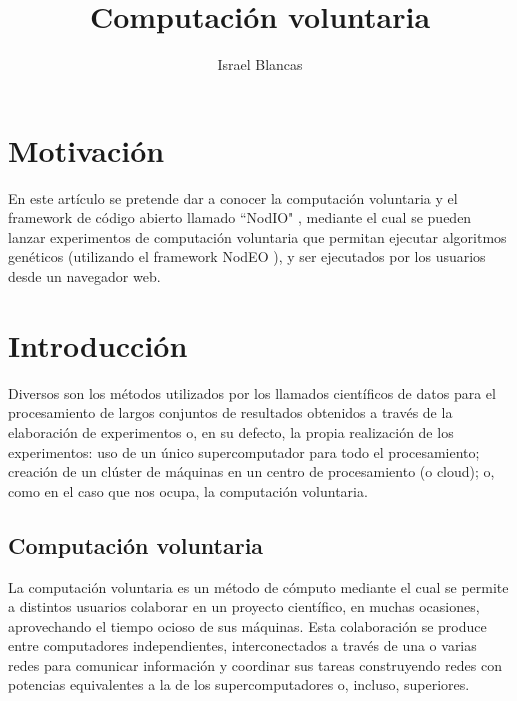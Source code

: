 \documentclass[runningheads,a4paper]{llncs}
\begin{document}
\mainmatter  %

\title{Computaci\'on voluntaria}


%
\author{Israel Blancas }
%


\maketitle


\begin{abstract}

\end{abstract}


\section{Motivaci\'on}
En este art\'iculo se pretende dar a conocer la computaci\'on voluntaria y
el framework de c\'odigo abierto llamado ``NodIO" \cite{nodio}, mediante el cual
se pueden lanzar experimentos de computaci\'on voluntaria
que permitan ejecutar algoritmos gen\'eticos (utilizando el framework NodEO \cite{nodeo}),
y ser ejecutados por los usuarios desde un navegador web.


\section{Introducci\'on}
%
Diversos son los m\'etodos utilizados por los llamados cient\'ificos
de datos para el procesamiento de largos conjuntos de resultados obtenidos
a trav\'es de la elaboraci\'on de experimentos o, en su defecto, la propia
realizaci\'on de los experimentos: uso de un único supercomputador para
todo el procesamiento; creaci\'on de un cl\'uster de m\'aquinas en un centro
de procesamiento (o cloud); o, como en el caso que nos ocupa, la computaci\'on voluntaria.

\subsection{Computaci\'on voluntaria}
La computaci\'on voluntaria es un m\'etodo de c\'omputo mediante el cual se
permite a distintos usuarios colaborar en un proyecto cient\'ifico,
en muchas ocasiones, aprovechando el tiempo ocioso de sus m\'aquinas. Esta colaboraci\'on
se produce entre computadores independientes, interconectados a trav\'es de una o varias redes
para comunicar informaci\'on y coordinar sus tareas construyendo redes con potencias
equivalentes a la de los supercomputadores o, incluso, superiores.
\end{document}
